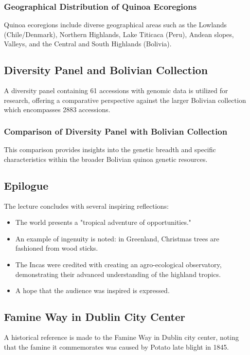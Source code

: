 \subsubsection{Geographical Distribution of Quinoa Ecoregions} 
Quinoa ecoregions include diverse geographical areas such as the Lowlands (Chile/Denmark), Northern Highlands, Lake Titicaca (Peru), Andean slopes, Valleys, and the Central and South Highlands (Bolivia).

\subsection{Diversity Panel and Bolivian Collection} 
A diversity panel containing 61 accessions with genomic data is utilized for research, offering a comparative perspective against the larger Bolivian collection which encompasses 2883 accessions.

\subsubsection{Comparison of Diversity Panel with Bolivian Collection} 
This comparison provides insights into the genetic breadth and specific characteristics within the broader Bolivian quinoa genetic resources.

\subsection{Epilogue} 
The lecture concludes with several inspiring reflections: 
\begin{itemize} 
    \item The world presents a "tropical adventure of opportunities." 
    \item An example of ingenuity is noted: in Greenland, Christmas trees are fashioned from wood sticks. 
    \item The Incas were credited with creating an agro-ecological observatory, demonstrating their advanced understanding of the highland tropics. 
    \item A hope that the audience was inspired is expressed. 
\end{itemize}

\subsection{Famine Way in Dublin City Center} 
A historical reference is made to the Famine Way in Dublin city center, noting that the famine it commemorates was caused by Potato late blight in 1845.

